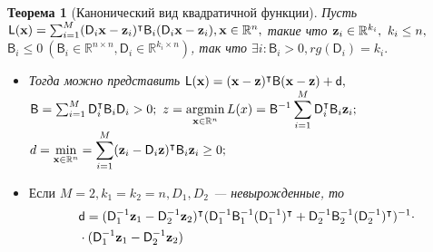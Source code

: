 \documentclass[12pt]{beamer}
\newtheorem{rustheorem}{Теорема }
\DeclareMathOperator*{\argmin}{argmin}
\let\T\intercal
\def\msf_#1{\mathsf{#1}}
\def\bo_#1{\bold{#1}}
\begin{document}
\begin{frame}
\begin{rustheorem}[Канонический вид квадратичной функции]
	Пусть $\msf_L(\bo_x) = \sum_{i=1}^M(\msf_D_i\bo_x - \bo_z_i)^\T\msf_B_i(\msf_D_i\bo_x - \bo_z_i), \bo_x\in\mathbb{R}^n,$ такие что $\bo_z_i\in\mathbb{R}^{k_i},\ k_i\leq n,$\\
		$\msf_B_i\leq 0\  (\msf_B_i\in\mathbb{R}^{n\times n},\msf_D_i\in\mathbb{R}^{k_i\times n})$, так что $\exists i: \msf_B_i>0, rg(\msf_D_i)=k_i.$\\
\begin{itemize}
\item Тогда можно представить $\msf_L(\bo_x) = (\bo_x  - \bo_z)^\T\msf_B(\bo_x-\bo_z)+\msf_d,$\\
$\msf_B = \sum_{i=1}^M \msf_D_i^\T\msf_B_i\msf_D_i>0;\ z=\displaystyle\argmin_{\bo_x\in\mathbb{R}^n}L(x)={\msf_B}^{-1}\sum_{i=1}^M
		\msf_D_i^\T\msf_B_i\bo_z_i;$\\
$d = \displaystyle\min_{\bo_x\in\mathbb{R}^n}=\sum_{i=1}^M(\bo_z_i-\msf_D_i\bo_z)^\T\msf_B_i\bo_z_i\geq0;$\\
\item $\text{Если }M=2, k_1=k_2=n, D_1, D_2$ --- невырожденные, то
\begin{align*}
&\msf_d=(\msf_D_1^{-1}\bo_z_1-\msf_D_2^{-1}\bo_z_2)^\T(\msf_D_1^{-1}\msf_B_1^{-1}(\msf_D_1^{-1})^\T+\msf_D_2^{-1}\msf_B_2^{-1}(\msf_D_2^{-1})^\T)^{-1}\cdot\\
		&\cdot(\msf_D_1^{-1}\bo_z_1-\msf_D_2^{-1}\bo_z_2)
\end{align*}
\end{itemize}
\end{rustheorem}
\end{frame}


\begin{frame}
\end{frame}

\end{document}
